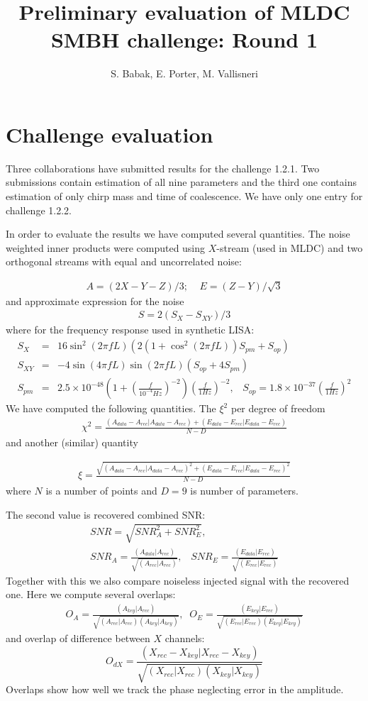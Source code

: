 \documentclass[prd,aps,amsfonts,amsmath, nofootinbib]{revtex4}
\def\be{\begin{equation}}
\def\en{\end{equation}}
\def\bea{\begin{eqnarray}}
\def\ena{\end{eqnarray}}
\begin{document}
\title{Preliminary evaluation of MLDC SMBH challenge: Round 1}
\author{S. Babak, E. Porter, M. Vallisneri}
\maketitle

\section{Challenge evaluation}

Three collaborations have submitted results for the challenge 1.2.1. Two submissions contain estimation of all nine parameters and the third 
one contains estimation of only chirp mass and time of coalescence.
We have only one entry for challenge 1.2.2.

In order to evaluate the results we have computed several quantities.
The noise weighted inner products were computed using $X$-stream
(used in MLDC) and two orthogonal streams with equal and uncorrelated 
noise:

\bea
A = (2X - Y - Z)/3; \;\;\;\; E = (Z - Y)/\sqrt{3}
\ena
and approximate expression for the noise \bea
S = 2(S_X - S_{XY})/3
\ena
where for the frequency response used in synthetic LISA:
\bea
S_X &=& 16 \sin^2(2\pi fL)  (2 (1 + \cos^2(2\pi fL)) S_{pm} + S_{op})\\
S_{XY} &=& -4 \sin(4\pi fL)\sin(2\pi fL)  ( S_{op} + 4S_{pm} )\\
S_{pm} &=& 2.5\times10^{-48} \left(1 + \left(\frac{f}{10^{-4}Hz}\right)^{-2}
\right)  \left(\frac{f}{1Hz}\right)^{-2},\;\;\;
S_{op} = 1.8\times 10^{-37}  \left(\frac{f}{1Hz}\right)^2
\ena
We have computed the following quantities. The $\xi^2$ per degree
of freedom
\bea
\chi^{2} = \frac{(A_{data}- A_{rec}|A_{data}- A_{rec}) + 
(E_{data} - E_{rec}|E_{data} - E_{rec})}
{N-D}
\ena
and another (similar) quantity

\bea
\xi = \frac{\sqrt{(A_{data}- A_{rec}|A_{data}- A_{rec})^2 + 
(E_{data} - E_{rec}|E_{data} - E_{rec})^2}}
{N-D}
\ena
where $N$ is a number of points and $D=9$ is number of parameters.

The second value is recovered combined SNR:
\bea
SNR = \sqrt{SNR_A^2 + SNR_E^2},\\
SNR_A = \frac{(A_{data}|A_{rec})}{\sqrt{(A_{rec}|A_{rec})}},\;\;\;
SNR_E = \frac{(E_{data}|E_{rec})}{\sqrt{(E_{rec}|E_{rec})}}
\ena
Together with this we also compare noiseless injected signal with 
the recovered one. Here we compute several overlaps:
\bea
O_A = \frac{(A_{key}|A_{rec})}{\sqrt{(A_{rec}|A_{rec})(A_{key}|A_{key})}}, \;\; 
O_E = \frac{(E_{key}|E_{rec})}{\sqrt{(E_{rec}|E_{rec})(E_{key}|E_{key})}}
\ena
and overlap of difference between $X$ channels:
\be
O_{dX} = \frac{(X_{rec}-X_{key}|X_{rec}-X_{key})}
{\sqrt{(X_{rec}|X_{rec})(X_{key}|X_{key})}}
\en
Overlaps show how well we track the phase neglecting error in 
the amplitude.
\end{document}
